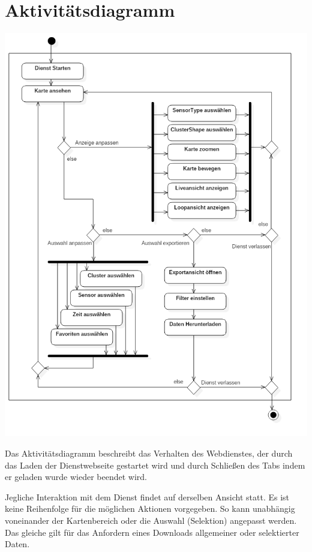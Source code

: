 \section{Aktivitätsdiagramm}
        \includegraphics[width=1\linewidth]{diagrams/ActivityDiagram1.png}
        
        Das Aktivitätsdiagramm beschreibt das Verhalten des Webdienstes, der durch das Laden der Dienstwebseite gestartet wird und durch Schließen des Tabs indem er geladen wurde wieder beendet wird.
        
        Jegliche Interaktion mit dem Dienst findet auf derselben Ansicht statt. Es ist keine Reihenfolge für die möglichen Aktionen vorgegeben. So kann unabhängig voneinander der Kartenbereich oder die Auswahl (Selektion) angepasst werden. Das gleiche gilt für das Anfordern eines Downloads allgemeiner oder selektierter Daten.
        
